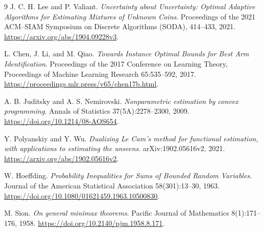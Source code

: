 \clearpage
{}
{}
\begin{thebibliography}{9}
J. C. H. Lee and P. Valiant.
\emph{Uncertainty about Uncertainty: Optimal Adaptive Algorithms for
Estimating Mixtures of Unknown Coins}.
Proceedings of the 2021 ACM--SIAM Symposium on Discrete Algorithms
(SODA), 414--433, 2021.
\url{https://arxiv.org/abs/1904.09228v3}.

L. Chen, J. Li, and M. Qiao.
\emph{Towards Instance Optimal Bounds for Best Arm Identification}.
Proceedings of the 2017 Conference on Learning Theory,
Proceedings of Machine Learning Research 65:535--592, 2017.
\url{https://proceedings.mlr.press/v65/chen17b.html}.

A. B. Juditsky and A. S. Nemirovski.
\emph{Nonparametric estimation by convex programming}.
Annals of Statistics 37(5A):2278--2300, 2009.
\url{https://doi.org/10.1214/08-AOS654}.

Y. Polyanskiy and Y. Wu.
\emph{Dualizing Le Cam's method for functional estimation, with
applications to estimating the unseens}.
arXiv:1902.05616v2, 2021.
\url{https://arxiv.org/abs/1902.05616v2}.

W. Hoeffding.
\emph{Probability Inequalities for Sums of Bounded Random Variables}.
Journal of the American Statistical Association 58(301):13--30, 1963.
\url{https://doi.org/10.1080/01621459.1963.10500830}.

M. Sion.
\emph{On general minimax theorems}.
Pacific Journal of Mathematics 8(1):171--176, 1958.
\url{https://doi.org/10.2140/pjm.1958.8.171}.
\end{thebibliography}
